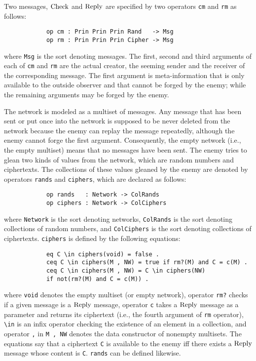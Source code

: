 \documentclass[a4paper,fleqn]{cas-dc}
\begin{document}
Two messages, $\rm Check$ and $\rm Reply$ are specified by two operators \verb!cm! and \verb!rm! as follows:
	\begin{small}
		\begin{verbatim}
			op cm : Prin Prin Prin Rand   -> Msg
			op rm : Prin Prin Prin Cipher -> Msg
		\end{verbatim}
	\end{small}
	
	\noindent
	where \verb!Msg! is the sort denoting messages.
	The first, second and third arguments of each of \verb!cm! and \verb!rm! are the actual creator, the seeming sender and the receiver of the corresponding message. The first argument is meta-information that is only available to the outside observer and that cannot be forged by the enemy; while the remaining arguments may be forged by the enemy. 
	
	The network is modeled as a multiset of messages. Any message that has been sent or put once into the network is supposed to be never deleted from the network because the enemy can replay the message repeatedly, although the enemy cannot forge the first argument. Consequently, the empty network (i.e., the empty multiset) means that no messages have been sent. The enemy tries to glean two kinds of values from the network, which are random numbers and ciphertexts. The collections of these values gleaned by the enemy are denoted by operators \verb!rands! and \verb!ciphers!, which are declared as follows:
	\begin{small}
		\begin{verbatim}
			op rands   : Network -> ColRands
			op ciphers : Network -> ColCiphers
		\end{verbatim}
	\end{small}
	
	\noindent
	where \verb!Network! is the sort denoting networks, \verb!ColRands! is the sort denoting collections of random numbers, and \verb!ColCiphers! is the sort denoting collections of ciphertexts. 
	\verb!ciphers! is defined by the following equations:
	\begin{small}
		\begin{verbatim}
			eq C \in ciphers(void) = false .
			ceq C \in ciphers(M , NW) = true if rm?(M) and C = c(M) .
			ceq C \in ciphers(M , NW) = C \in ciphers(NW) 
			if not(rm?(M) and C = c(M)) .
		\end{verbatim}
	\end{small}
	
	\noindent
	where \verb!void! denotes the empty multiset (or empty network),
	operator \verb!rm?! checks if a given message is a $\rm Reply$ message,
	operator \verb!c! takes a $\rm Reply$ message as a parameter and returns its ciphertext (i.e., the fourth argument of \verb!rm! operator),
	\verb!\in! is an infix operator checking the existence of an element in a collection,
	and operator \verb!,! in \verb!M , NW! denotes the data constructor of nonempty multisets. 
	The equations say that a ciphertext \verb!C! is available to the enemy iff there exists a $\rm Reply$ message whose content is \verb!C!. \verb!rands! can be defined likewise.
	
\end{document}
